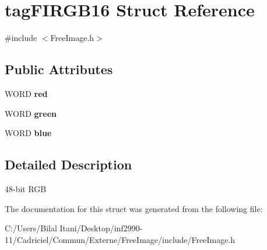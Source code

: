 \hypertarget{structtag_f_i_r_g_b16}{}\section{tag\+F\+I\+R\+G\+B16 Struct Reference}
\label{structtag_f_i_r_g_b16}


{\ttfamily \#include $<$Free\+Image.\+h$>$}

\subsection*{Public Attributes}
\begin{DoxyCompactItemize}
\item 
W\+O\+RD {\bfseries red}\hypertarget{structtag_f_i_r_g_b16_aeaa2393246d6482c02cac30d169ee022}{}\label{structtag_f_i_r_g_b16_aeaa2393246d6482c02cac30d169ee022}

\item 
W\+O\+RD {\bfseries green}\hypertarget{structtag_f_i_r_g_b16_a00e213246943f0a47698fdd0d51f9924}{}\label{structtag_f_i_r_g_b16_a00e213246943f0a47698fdd0d51f9924}

\item 
W\+O\+RD {\bfseries blue}\hypertarget{structtag_f_i_r_g_b16_ae9de217a4d3c01c533bc8e727c0ec0eb}{}\label{structtag_f_i_r_g_b16_ae9de217a4d3c01c533bc8e727c0ec0eb}

\end{DoxyCompactItemize}


\subsection{Detailed Description}
48-\/bit R\+GB 

The documentation for this struct was generated from the following file\+:\begin{DoxyCompactItemize}
\item 
C\+:/\+Users/\+Bilal Itani/\+Desktop/inf2990-\/11/\+Cadriciel/\+Commun/\+Externe/\+Free\+Image/include/Free\+Image.\+h\end{DoxyCompactItemize}
